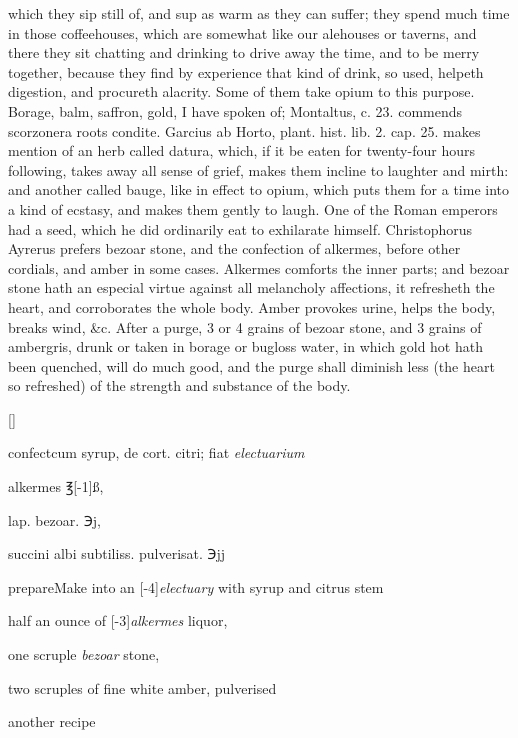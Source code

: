 which they sip still of, and sup as warm as they can suffer; they spend
much time in those coffeehouses, which are somewhat like our alehouses
or taverns, and there they sit chatting and drinking to drive away the
time, and to be merry together, because they find by experience that
kind of drink, so used, helpeth digestion, and procureth alacrity. Some
of them take opium to this purpose.
Borage, balm, saffron, gold, I have spoken of; Montaltus, c. 23.
commends scorzonera roots condite. Garcius ab Horto, plant. hist. lib.
2. cap. 25. makes mention of an herb called datura, which, if it
be eaten for twenty-four hours following, takes away all sense of
grief, makes them incline to laughter and mirth: and another called
bauge, like in effect to opium, which puts them for a time into a kind
of ecstasy, and makes them gently to laugh. One of the Roman emperors
had a seed, which he did ordinarily eat to exhilarate himself.
Christophorus Ayrerus prefers bezoar stone, and the confection of
alkermes, before other cordials, and amber in some cases.
Alkermes comforts the inner parts; and bezoar stone hath an
especial virtue against all melancholy affections, it refresheth
the heart, and corroborates the whole body. Amber provokes urine,
helps the body, breaks wind, \&c. After a purge, 3 or 4 grains of bezoar
stone, and 3 grains of ambergris, drunk or taken in borage or bugloss
water, in which gold hot hath been quenched, will do much good, and the
purge shall diminish less (the heart so refreshed) of the strength and
substance of the body.

\begin{Prescription}[H]
[\baselineskip]
\begin{prescriptionbox}{\textlatin{confect}}{\textlatin{cum syrup, de cort. citri; fiat \emph{electuarium}}}
\item alkermes ℥[-1\baselineskip]ß,
\item \textlatin{lap. bezoar.} ℈j,
\item \textlatin{succini albi subtiliss. pulverisat. ℈jj}
\end{prescriptionbox}
\begin{prescriptionbox}{prepare}{Make into an [-4\baselineskip]\emph{electuary} with syrup and citrus stem}
\item half an ounce of [-3\baselineskip]\emph{alkermes} liquor,
\item one scruple \emph{bezoar} stone,
\item two scruples of fine white amber, pulverised
\end{prescriptionbox}
\caption{another recipe}
\end{Prescription}

